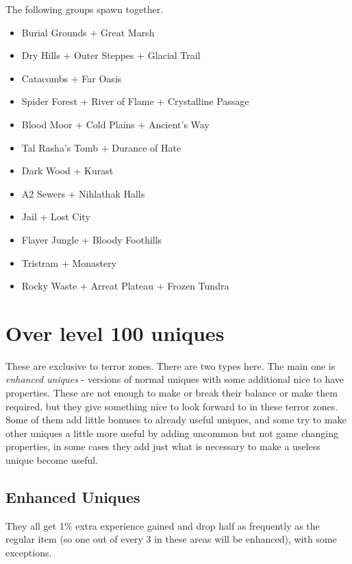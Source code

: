 \documentclass[12pt,a4paper]{article}
\begin{document}
The following groups spawn together.

\begin{itemize}
\item Burial Grounds + Great Marsh
\item Dry Hills + Outer Steppes + Glacial Trail
\item Catacombs + Far Oasis
\item Spider Forest + River of Flame + Crystalline Passage
\item Blood Moor + Cold Plains + Ancient's Way
\item Tal Rasha's Tomb + Durance of Hate
\item Dark Wood + Kurast
\item A2 Sewers + Nihlathak Halls
\item Jail + Lost City
\item Flayer Jungle + Bloody Foothills
\item Tristram + Monastery
\item Rocky Waste + Arreat Plateau + Frozen Tundra
\end{itemize}

\section{Over level 100 uniques}

These are exclusive to terror zones. There are two types here. The main one is {\emph{enhanced uniques}} - versions of normal uniques with some additional nice to have properties. These are not enough to make or break their balance or make them required, but they give something nice to look forward to in these terror zones. Some of them add little bonuses to already useful uniques, and some try to make other uniques a little more useful by adding uncommon but not game changing properties, in some cases they add just what is necessary to make a useless unique become useful.\\

\subsection{Enhanced Uniques}

They all get 1\% extra experience gained and drop half as frequently as the regular item (so one out of every 3 in these areas will be enhanced), with some exceptions.
\end{document}

